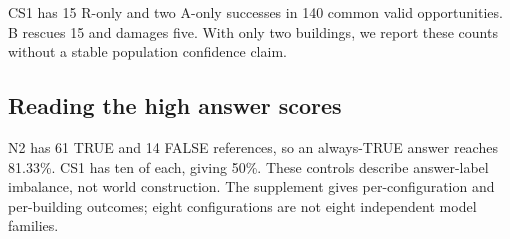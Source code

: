 CS1 has 15 R-only and two A-only successes in 140 common valid
opportunities. B rescues 15 and damages five.
With only two buildings, we report these counts without a stable
population confidence claim.

\subsection{Reading the high answer scores}
N2 has 61 TRUE and 14 FALSE references, so an always-TRUE answer reaches
81.33\%. CS1 has ten of each, giving 50\%.
These controls describe answer-label imbalance, not world construction.
The supplement gives per-configuration and per-building outcomes;
eight configurations are not eight independent model families.
